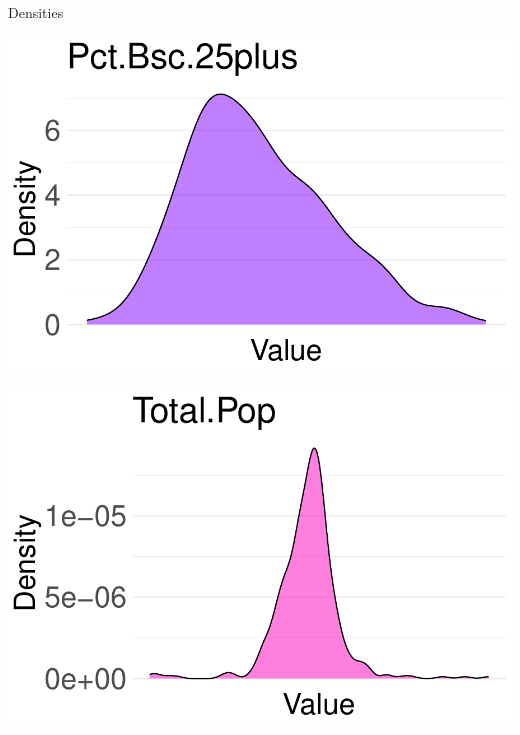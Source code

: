 \documentclass{beamer}
\begin{document}
\begin{frame}{Densities}
\begin{minipage}{0.3\textwidth}
    \end{minipage}
    
    \vspace{0.2cm} %

    \begin{minipage}{0.3\textwidth}
        \centering
        \includegraphics[width=\textwidth]{plots/Pct.Bsc.25plus_density_plot.pdf}
    \end{minipage}
    \hfill
    \begin{minipage}{0.3\textwidth}
        \centering
        \includegraphics[width=\textwidth]{plots/Total.Pop_density_plot.pdf}
    \end{minipage} 
    \hfill
    \begin{minipage}{0.3\textwidth}
        \hfill
    \end{minipage}
\end{frame}
\end{document}
